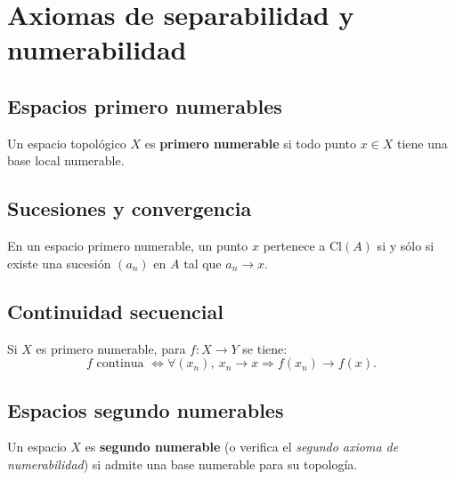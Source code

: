 ﻿\section{Axiomas de separabilidad y numerabilidad}


\subsection{Espacios primero numerables}

\begin{definición}
    Un espacio topológico $X$ es \textbf{primero numerable} si todo punto $x\in X$ tiene una base local numerable.
\end{definición}


\subsection{Sucesiones y convergencia}

\begin{proposición}
    En un espacio primero numerable, un punto $x$ pertenece a $\mathrm{Cl}(A)$ si y sólo si existe una sucesión $(a_n)$ en $A$ tal que $a_n\to x$.
\end{proposición}

\subsection{Continuidad secuencial}

\begin{proposición}
    Si $X$ es primero numerable, para $f:X\to Y$ se tiene:
    $$f \text{ continua } \Longleftrightarrow \forall (x_n),\ x_n\to x \Rightarrow f(x_n)\to f(x).$$
\end{proposición}


\subsection{Espacios segundo numerables}

\begin{definición}
    Un espacio $X$ es \textbf{segundo numerable} (o verifica el \emph{segundo axioma de numerabilidad}) si admite una base numerable para su topología.
\end{definición}

